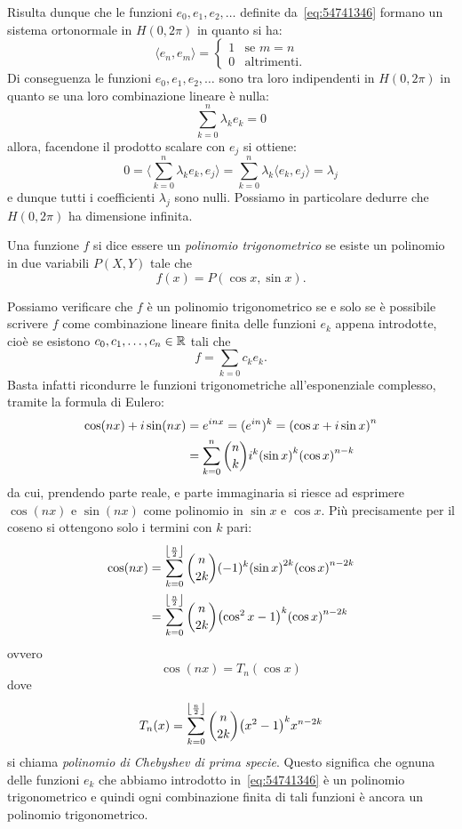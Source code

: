 Risulta dunque che le funzioni $e_0,e_1,e_2,\dots$ definite da~\eqref{eq:54741346}
formano un sistema ortonormale in $H(0,2\pi)$
in quanto si ha:
\[
  \langle e_n, e_m \rangle =
  \begin{cases} 1 &\text{se $m=n$}\\
  0 & \text{altrimenti}.
  \end{cases}
\]
Di conseguenza le funzioni $e_0,e_1,e_2, \dots$ sono tra loro indipendenti
in $H(0,2\pi)$ in quanto se una loro combinazione lineare è nulla:
\[
  \sum_{k=0}^n \lambda_k e_k = 0
\]
allora, facendone il prodotto scalare con $e_j$ si ottiene:
\[
  0 = \langle \sum_{k=0}^n \lambda_k e_k , e_j\rangle
  = \sum_{k=0}^n \lambda_k \langle e_k, e_j\rangle
  = \lambda_j
\]
e dunque tutti i coefficienti $\lambda_j$ sono nulli.
Possiamo in particolare dedurre che $H(0,2\pi)$ ha dimensione
infinita.

\begin{definition}
Una funzione $f$ si dice essere un \emph{polinomio trigonometrico}%
se esiste un polinomio in due variabili $P(X,Y)$ tale che
\[
  f(x) = P(\cos x, \sin x).
\]
\end{definition}

Possiamo verificare che $f$ è un polinomio trigonometrico se e solo se
è possibile scrivere $f$ come combinazione lineare finita delle funzioni $e_k$
appena introdotte,
cioè se esistono $c_0, c_1, \dots, c_n\in {\mathbb R}$ tali che
\[
  f = \sum_{k=0} c_k e_k.
\]
Basta infatti ricondurre le funzioni trigonometriche all'esponenziale complesso,
tramite la formula di Eulero:
\begin{align*}
   \cos(nx) + i \sin(nx)
   &= e^{inx} = (e^{in})^k
   = {\left( \cos x + i \sin x \right)}^n\\
   &= \sum_{k=0}^n {n \choose k} i^k {\left( \sin x \right)}^k {\left( \cos x \right)}^{n-k}
\end{align*}
da cui, prendendo parte reale, e parte immaginaria si
riesce ad esprimere $\cos(nx)$ e $\sin(nx)$ come polinomio in $\sin x$ e $\cos x$.
Più precisamente per il coseno
si ottengono solo i termini con $k$ pari:
\begin{align*}
\cos(nx) &= \sum_{k=0}^{\left\lfloor \frac n 2 \right\rfloor} {n \choose 2k} (-1)^k {\left( \sin x \right)}^{2k} {\left( \cos x \right)}^{n-2k}\\
&= \sum_{k=0}^{\left\lfloor \frac n 2 \right\rfloor}{n \choose 2k} {\left( \cos^2 x -1 \right)}^k {\left( \cos x \right)}^{n-2k}
\end{align*}
ovvero
\[
  \cos(nx) = T_n(\cos x)
\]
dove
\[
  T_n(x) = \sum_{k=0}^{\left\lfloor \frac n 2 \right\rfloor}{n \choose 2k} {\left( x^2 -1 \right)}^k x^{n-2k}
\]
si chiama \emph{polinomio di Chebyshev di prima specie}.
%
%
Questo significa che ognuna delle funzioni $e_k$ che abbiamo introdotto
in~\eqref{eq:54741346} è un polinomio trigonometrico e quindi ogni
combinazione finita di tali funzioni è ancora un polinomio trigonometrico.

